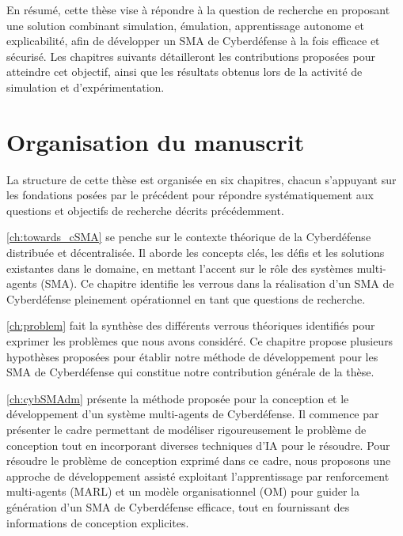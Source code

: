 En résumé, cette thèse vise à répondre à la question de recherche en proposant une solution combinant simulation, émulation, apprentissage autonome et explicabilité, afin de développer un SMA de Cyberdéfense à la fois efficace et sécurisé. Les chapitres suivants détailleront les contributions proposées pour atteindre cet objectif, ainsi que les résultats obtenus lors de la activité de simulation et d'expérimentation.


\section{Organisation du manuscrit}

La structure de cette thèse est organisée en six chapitres, chacun s'appuyant sur les fondations posées par le précédent pour répondre systématiquement aux questions et objectifs de recherche décrits précédemment.


\autoref{ch:towards_cSMA} se penche sur le contexte théorique de la Cyberdéfense distribuée et décentralisée. Il aborde les concepts clés, les défis et les solutions existantes dans le domaine, en mettant l'accent sur le rôle des systèmes multi-agents (SMA). Ce chapitre identifie les verrous dans la réalisation d'un SMA de Cyberdéfense pleinement opérationnel en tant que questions de recherche. 

\autoref{ch:problem} fait la synthèse des différents verrous théoriques identifiés pour exprimer les problèmes que nous avons considéré. Ce chapitre propose plusieurs hypothèses proposées pour établir notre méthode de développement pour les SMA de Cyberdéfense qui constitue notre contribution générale de la thèse.

\autoref{ch:cybSMAdm} présente la méthode proposée pour la conception et le développement d'un système multi-agents de Cyberdéfense. Il commence par présenter le cadre permettant de modéliser rigoureusement le problème de conception tout en incorporant diverses techniques d'IA pour le résoudre. Pour résoudre le problème de conception exprimé dans ce cadre, nous proposons une approche de développement assisté exploitant l'apprentissage par renforcement multi-agents (MARL) et un modèle organisationnel (OM) pour guider la génération d'un SMA de Cyberdéfense efficace, tout en fournissant des informations de conception explicites.

